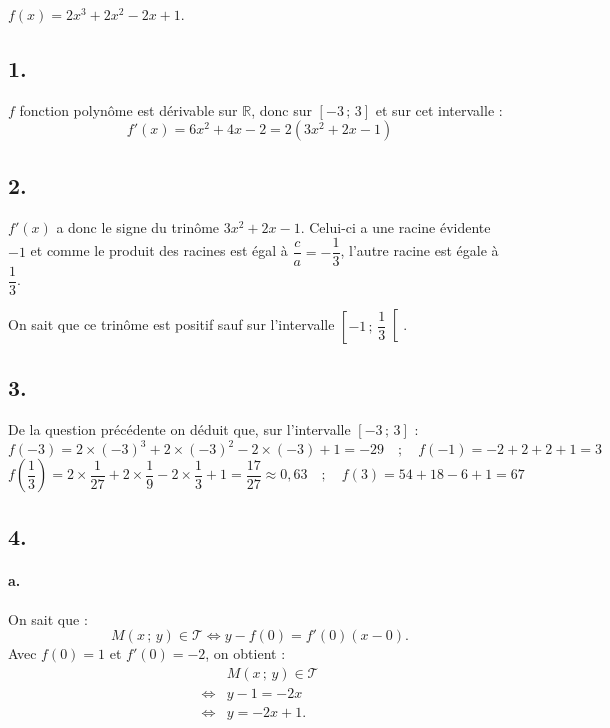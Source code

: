 \(f(x) = 2x^3 + 2x^2 - 2x + 1\).

\subsection*{1.}

\(f\) fonction polynôme est dérivable sur \(\mathbb{R}\), donc sur \([-3\,;\,3]\) et sur cet intervalle :
\[
f'(x) = 6x^2 + 4x - 2 = 2(3x^2 + 2x - 1)
\]

\subsection*{2.}

\(f'(x)\) a donc le signe du trinôme \(3x^2 + 2x - 1\). Celui-ci a une racine évidente \(-1\) et comme le produit des racines est égal à \(\dfrac{c}{a} = -\dfrac{1}{3}\), l'autre racine est égale à \(\dfrac{1}{3}\).

On sait que ce trinôme est positif sauf sur l'intervalle \(\left[-1\,;\,\dfrac{1}{3}\right[\).

\subsection*{3.}

De la question précédente on déduit que, sur l'intervalle \([-3\,;\,3]\) :
\[f(-3) = 2 \times (-3)^3 + 2 \times (-3)^2 - 2 \times (-3) + 1 = -29 \quad ; \quad f(-1) = -2 + 2 + 2 + 1 = 3\]
\[f\left(\dfrac{1}{3}\right) = 2 \times \dfrac{1}{27} + 2 \times \dfrac{1}{9} - 2 \times \dfrac{1}{3} + 1 = \dfrac{17}{27} \approx 0{,}63 \quad ; \quad f(3) = 54 + 18 - 6 + 1 = 67\]
\begin{center}
\end{center}

\subsection*{4.}

\paragraph{a.} On sait que :
\[
M(x\,;\,y) \in \mathcal{T} \iff y - f(0) = f'(0)(x - 0).
\]
Avec \(f(0) = 1\) et \(f'(0) = -2\), on obtient :
\begin{align*}
&M(x\,;\,y) \in \mathcal{T} \\
\iff &y - 1 = -2x \\
\iff &y = -2x + 1.
\end{align*}

